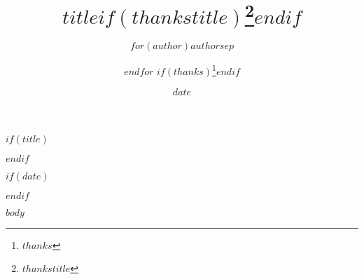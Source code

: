 \documentclass[12pt]{article}
\theoremstyle{plain}
\begin{document}
$if(title)$
\title{$title$$if(thankstitle)$\thanks{$thankstitle$}$endif$}
$endif$
\author{$for(author)$$author$$sep$ \and $endfor$ $if(thanks)$\thanks{$thanks$}$endif$}
$if(date)$\date{$date$}$endif$
\maketitle

\vspace{-.3in}

$body$
\end{document}
